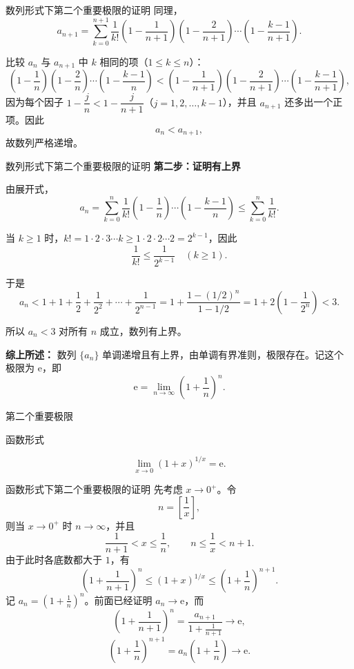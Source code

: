 \documentclass[aspectratio=169,10pt]{ctexbeamer}
\newcommand{\ee}{\mathrm{e}}
\begin{document}
\begin{frame}{数列形式下第二个重要极限的证明}
	同理，
	\[
	a_{n+1} = \sum_{k=0}^{n+1} \dfrac{1}{k!} \left(1-\dfrac{1}{n+1}\right)\left(1-\dfrac{2}{n+1}\right)\cdots\left(1-\dfrac{k-1}{n+1}\right).
	\]
	
	比较 \(a_n\) 与 \(a_{n+1}\) 中 \(k\) 相同的项（\(1 \leq k \leq n\)）：
	\[
	\left(1-\dfrac{1}{n}\right)\left(1-\dfrac{2}{n}\right)\cdots\left(1-\dfrac{k-1}{n}\right) < \left(1-\dfrac{1}{n+1}\right)\left(1-\dfrac{2}{n+1}\right)\cdots\left(1-\dfrac{k-1}{n+1}\right),
	\]
	因为每个因子 \(1-\dfrac{j}{n}<1-\dfrac{j}{n+1}\)（\(j=1,2,\dots,k-1\)），并且 \(a_{n+1}\) 还多出一个正项。因此
	\[
	a_n < a_{n+1},
	\]
	故数列严格递增。
\end{frame}
\begin{frame}{数列形式下第二个重要极限的证明}
	\small
	\noindent\textbf{第二步：证明有上界}
	
	由展开式，
	\[
	a_n = \sum_{k=0}^{n} \dfrac{1}{k!} \left(1-\dfrac{1}{n}\right)\cdots\left(1-\dfrac{k-1}{n}\right) \leq \sum_{k=0}^{n} \dfrac{1}{k!}.
	\]
	
	当 \(k \geq 1\) 时，\(k! = 1 \cdot 2 \cdot 3 \cdots k \geq 1 \cdot 2 \cdot 2 \cdots 2 = 2^{k-1}\)，因此
	\[
	\dfrac{1}{k!} \leq \dfrac{1}{2^{k-1}} \quad (k \geq 1).
	\]
	
	于是
	\[
	a_n < 1 + 1 + \dfrac{1}{2} + \dfrac{1}{2^2} + \cdots + \dfrac{1}{2^{n-1}} = 1 + \dfrac{1 - (1/2)^n}{1 - 1/2} = 1 + 2\left(1 - \dfrac{1}{2^n}\right) < 3.
	\]
	
	所以 \(a_n < 3\) 对所有 \(n\) 成立，数列有上界。
	
	\noindent\textbf{综上所述：} 数列 \(\{a_n\}\) 单调递增且有上界，由单调有界准则，极限存在。记这个极限为 \(\ee\)，即
	\[
	\ee = \lim\limits_{n\to\infty} \left(1+\dfrac{1}{n}\right)^n.
	\]
\end{frame}


\begin{frame}{第二个重要极限}
	\normalsize
	\begin{block}{函数形式}
		
		\[
		\lim\limits_{x\to0}(1+x)^{1/x}=\ee.
		\]
	\end{block}
\end{frame}

\begin{frame}{函数形式下第二个重要极限的证明}
	\small
	先考虑 \(x\to0^+\)。令
	\[
	n=\left    [     \frac1x\right   ] ,
	\]
	则当 \(x\to0^+\) 时 \(n\to\infty\)，并且
	\[
	\frac1{n+1}<x\leq\frac1n,\qquad n\leq\frac1x<n+1.
	\]
	由于此时各底数都大于 \(1\)，有
	\[
	\left(1+\frac1{n+1}\right)^n
	\leq(1+x)^{1/x}
	\leq\left(1+\frac1n\right)^{n+1}.
	\]
	记 \(a_n=(1+\frac1n)^n\)。前面已经证明 \(a_n\to\ee\)，而
	\[
	\left(1+\frac1{n+1}\right)^n
	=\frac{a_{n+1}}{1+\frac1{n+1}}\to\ee,
	\]
	\[
	\left(1+\frac1n\right)^{n+1}
	=a_n\left(1+\frac1n\right)\to\ee.
	\]
\end{frame}
\end{document}

